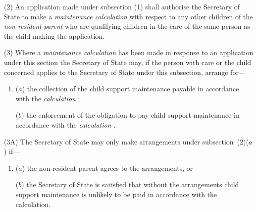 \documentclass[12pt,a4paper]{article}
\begin{document}
(2) An application made under subsection (1)  shall authorise the 
Secretary of State  %
to make a 
\emph{maintenance calculation}  %
with respect to any other children of the 
\emph{non-resident parent}  %
who are qualifying children in the care of the same person as the child making the application.

(3) Where a 
\emph{maintenance calculation}  %
has been made in response to an application under this section the 
Secretary of State  %
may, if the 
person with care or  %
the child concerned applies to 
the Secretary of State  %
under this subsection, arrange for—
\begin{enumerate}\item[]
($a$) the collection of the child support maintenance payable in accordance with the 
\emph{calculation}%
;

($b$) the enforcement of the obligation to pay child support maintenance in accordance with the 
\emph{calculation}%
.
\end{enumerate}

(3A) The 
Secretary of State  %
may only make arrangements under subsection~(2)($a$) if—
\begin{enumerate}\item[]
($a$) the non-resident parent agrees to the arrangements, or

($b$) the 
Secretary of State  %
is satisfied that without the arrangements child support maintenance is unlikely to be paid in accordance with the calculation.
\end{enumerate}
\end{document}

